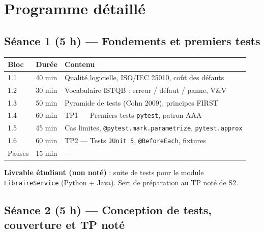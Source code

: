 \documentclass[11pt,a4paper]{article}
\begin{document}
\section{Programme détaillé}

\subsection{Séance 1 (5 h) --- Fondements et premiers tests}

\begin{tabularx}{\linewidth}{@{}C{1.0cm} C{1.6cm} X@{}}
\toprule
\textbf{Bloc} & \textbf{Durée} & \textbf{Contenu} \\
 & 40 min & Qualité logicielle, ISO/IEC 25010, coût des défauts \\
1.2 & 30 min & Vocabulaire ISTQB : erreur / défaut / panne, V\&V \\
1.3 & 50 min & Pyramide de tests (Cohn 2009), principes FIRST \\
1.4 & 60 min & TP1 --- Premiers tests \texttt{pytest}, patron AAA \\
1.5 & 45 min & Cas limites, \texttt{@pytest.mark.parametrize}, \texttt{pytest.approx} \\
1.6 & 60 min & TP2 --- Tests \texttt{JUnit~5}, \texttt{@BeforeEach}, fixtures \\
Pauses & 15 min & --- \\
\bottomrule
\end{tabularx}

\begin{noteinfo}
\textbf{Livrable étudiant (non noté)} : suite de tests pour le module \texttt{LibraireService} (Python + Java). Sert de préparation au TP noté de S2.
\end{noteinfo}

\subsection{Séance 2 (5 h) --- Conception de tests, couverture et TP noté}
\end{document}
